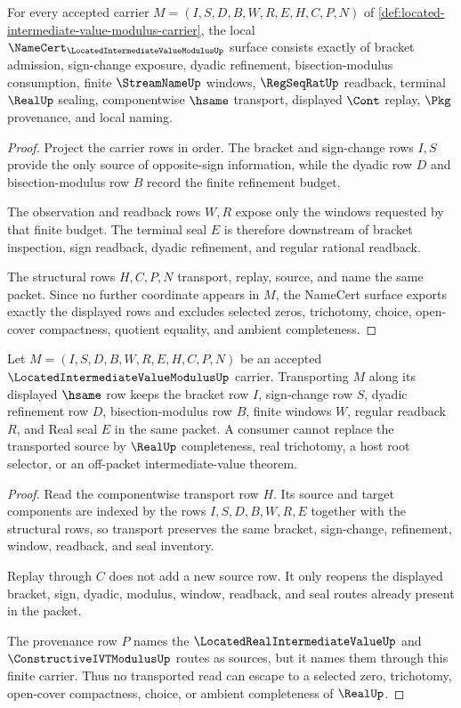 \begin{theorem}\label{thm:located-intermediate-value-modulus-namecert-obligations}
For every accepted carrier $M=(I,S,D,B,W,R,E,H,C,P,N)$ of \autoref{def:located-intermediate-value-modulus-carrier}, the local $\NameCert_{\LocatedIntermediateValueModulusUp}$ surface consists exactly of bracket admission, sign-change exposure, dyadic refinement, bisection-modulus consumption, finite $\StreamNameUp$ windows, $\RegSeqRatUp$ readback, terminal $\RealUp$ sealing, componentwise $\hsame$ transport, displayed $\Cont$ replay, $\Pkg$ provenance, and local naming.
\end{theorem}
\begin{proof}
Project the carrier rows in order. The bracket and sign-change rows $I,S$ provide the only source of opposite-sign information, while the dyadic row $D$ and bisection-modulus row $B$ record the finite refinement budget.

The observation and readback rows $W,R$ expose only the windows requested by that finite budget. The terminal seal $E$ is therefore downstream of bracket inspection, sign readback, dyadic refinement, and regular rational readback.

The structural rows $H,C,P,N$ transport, replay, source, and name the same packet. Since no further coordinate appears in $M$, the NameCert surface exports exactly the displayed rows and excludes selected zeros, trichotomy, choice, open-cover compactness, quotient equality, and ambient completeness.
\end{proof}

\begin{theorem}\label{thm:located-intermediate-value-modulus-source-stability}
Let $M=(I,S,D,B,W,R,E,H,C,P,N)$ be an accepted $\LocatedIntermediateValueModulusUp$ carrier. Transporting $M$ along its displayed $\hsame$ row keeps the bracket row $I$, sign-change row $S$, dyadic refinement row $D$, bisection-modulus row $B$, finite windows $W$, regular readback $R$, and Real seal $E$ in the same packet. A consumer cannot replace the transported source by $\RealUp$ completeness, real trichotomy, a host root selector, or an off-packet intermediate-value theorem.
\end{theorem}
\begin{proof}
Read the componentwise transport row $H$. Its source and target components are indexed by the rows $I,S,D,B,W,R,E$ together with the structural rows, so transport preserves the same bracket, sign-change, refinement, window, readback, and seal inventory.

Replay through $C$ does not add a new source row. It only reopens the displayed bracket, sign, dyadic, modulus, window, readback, and seal routes already present in the packet.

The provenance row $P$ names the $\LocatedRealIntermediateValueUp$ and $\ConstructiveIVTModulusUp$ routes as sources, but it names them through this finite carrier. Thus no transported read can escape to a selected zero, trichotomy, open-cover compactness, choice, or ambient completeness of $\RealUp$.
\end{proof}


